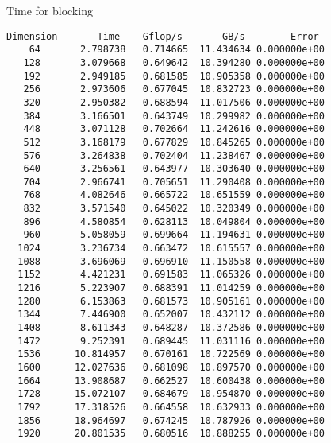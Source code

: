 \documentclass[titlepage]{article}
\begin{document}
Time for blocking
\begin{verbatim}
Dimension       Time    Gflop/s       GB/s        Error
    64       2.798738   0.714665  11.434634 0.000000e+00
   128       3.079668   0.649642  10.394280 0.000000e+00
   192       2.949185   0.681585  10.905358 0.000000e+00
   256       2.973606   0.677045  10.832723 0.000000e+00
   320       2.950382   0.688594  11.017506 0.000000e+00
   384       3.166501   0.643749  10.299982 0.000000e+00
   448       3.071128   0.702664  11.242616 0.000000e+00
   512       3.168179   0.677829  10.845265 0.000000e+00
   576       3.264838   0.702404  11.238467 0.000000e+00
   640       3.256561   0.643977  10.303640 0.000000e+00
   704       2.966741   0.705651  11.290408 0.000000e+00
   768       4.082646   0.665722  10.651559 0.000000e+00
   832       3.571540   0.645022  10.320349 0.000000e+00
   896       4.580854   0.628113  10.049804 0.000000e+00
   960       5.058059   0.699664  11.194631 0.000000e+00
  1024       3.236734   0.663472  10.615557 0.000000e+00
  1088       3.696069   0.696910  11.150558 0.000000e+00
  1152       4.421231   0.691583  11.065326 0.000000e+00
  1216       5.223907   0.688391  11.014259 0.000000e+00
  1280       6.153863   0.681573  10.905161 0.000000e+00
  1344       7.446900   0.652007  10.432112 0.000000e+00
  1408       8.611343   0.648287  10.372586 0.000000e+00
  1472       9.252391   0.689445  11.031116 0.000000e+00
  1536      10.814957   0.670161  10.722569 0.000000e+00
  1600      12.027636   0.681098  10.897570 0.000000e+00
  1664      13.908687   0.662527  10.600438 0.000000e+00
  1728      15.072107   0.684679  10.954870 0.000000e+00
  1792      17.318526   0.664558  10.632933 0.000000e+00
  1856      18.964697   0.674245  10.787926 0.000000e+00
  1920      20.801535   0.680516  10.888255 0.000000e+00

\end{verbatim}
\end{document}
